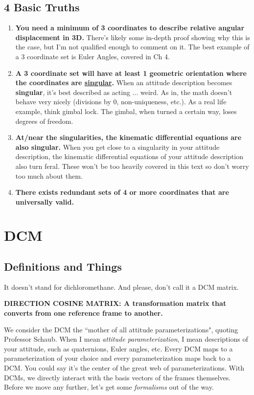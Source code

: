 \documentclass[a4paper,14pt]{extreport}
\begin{document}
\section{4 Basic Truths}
\begin{enumerate}
\item \textbf{You need a minimum of 3 coordinates to describe relative angular displacement in 3D.} There's likely some in-depth proof showing why this is the case, but I'm not qualified enough to comment on it. The best example of a 3 coordinate set is Euler Angles, covered in Ch 4.

\item \textbf{A 3 coordinate set will have at least 1 geometric orientation where the coordinates are \underline{singular}.} When an attitude description becomes \textbf{singular}, it's best described as acting ... weird. As in, the math doesn't behave very nicely (divisions by 0, non-uniqueness, etc.). As a real life example, think gimbal lock. The gimbal, when turned a certain way, loses degrees of freedom.

\item \textbf{At/near the singularities, the kinematic differential equations are also singular.} When you get close to a singularity in your attitude description, the kinematic differential equations of your attitude description also turn feral. These won't be too heavily covered in this text so don't worry too much about them.

\item \textbf{There exists redundant sets of 4 or more coordinates that are universally valid.}

\end{enumerate}
\chapter{DCM}
\section{Definitions and Things}
It doesn't stand for dichloromethane. And please, don't call it a DCM matrix.

\begin{center}
\textbf{DIRECTION COSINE MATRIX: A transformation matrix that converts from one reference frame to another.}
\end{center}

We consider the DCM the ``mother of all attitude parameterizations", quoting Professor Schaub. When I mean \emph{attitude parameterization}, I mean descriptions of your attitude, such as quaternions, Euler angles, etc. Every DCM maps to a parameterization of your choice and every parameterization maps back to a DCM. You could say it's the center of the great web of parameterizations. With DCMs, we directly interact with the basis vectors of the frames themselves. Before we move any further, let's get some \emph{formalisms} out of the way.
\end{document}
